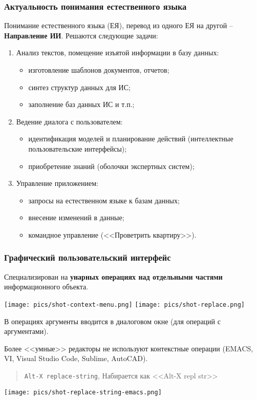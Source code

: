 \documentclass[10pt]{beamer}
\begin{document}
\begin{frame}
  \frametitle{Актуальность понимания естественного языка}
  \footnotesize
  Понимание естественного языка (ЕЯ), перевод из одного ЕЯ на другой -- \textbf{Направление ИИ}. Решаются следующие задачи:
  \begin{enumerate}
  \item Анализ текстов, помещение изъятой информации в базу данных:
    \begin{itemize}
    \item изготовление шаблонов документов, отчетов;
    \item синтез структур данных для ИС;
    \item заполнение баз данных ИС и т.п.;
    \end{itemize}
  \item Ведение диалога с пользователем:
    \begin{itemize}
    \item идентификация моделей и планирование действий (интеллектные пользовательские интерфейсы);
    \item приобретение знаний (оболочки экспертных систем);
    \end{itemize}
  \item Управление приложением:
    \begin{itemize}
    \item запросы на естественном языке к базам данных;
    \item внесение изменений в данные;
    \item командное управление (<<Проветрить квартиру>>).
    \end{itemize}
  \end{enumerate}
\end{frame}

\begin{frame}
  \frametitle{Графический пользовательский интерфейс}
  Специализирован на \textbf{унарных операциях над отдельными частями} информационного объекта.
  \begin{center}
    \texttt{[image: pics/shot-context-menu.png]}\qquad
    \texttt{[image: pics/shot-replace.png]}
  \end{center}
  В операциях аргументы вводится в диалоговом окне (для операций с аргументами).

  Более <<умные>> редакторы не используют контекстные операции (EMACS, VI, Visual Studio Code, Sublime, AutoCAD).
\begin{quote}
  \texttt{Alt-X replace-string}, Набирается как <<Alt-X repl str>>
\end{quote}
\begin{center}
    \texttt{[image: pics/shot-replace-string-emacs.png]}\qquad
  \end{center}
\end{frame}
\end{document}
